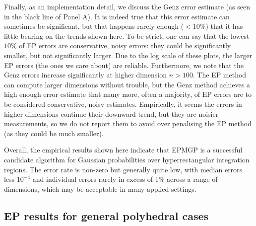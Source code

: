 \documentclass[twoside,11pt]{article}
\begin{document}
Finally, as an implementation detail, we discuss the Genz error estimate (as seen in the black line of Panel A).  It is indeed true that this error estimate can sometimes be significant, but that happens rarely enough ($<10\%$) that it has little bearing on the trends shown here.  To be strict, one can say that the lowest $10\%$ of EP errors are conservative, noisy errors: they could be significantly smaller, but not significantly larger.  Due to the log scale of these plots, the larger EP errors (the ones we care about) are reliable.  Furthermore, we note that the Genz errors increase significantly at higher dimension $n>100$.  The EP method can compute larger dimensions without trouble, but the Genz method achieves a high enough error estimate that many more, often a majority, of EP errors are to be considered conservative, noisy estimates.  Empirically, it seems the errors in higher dimensions continue their downward trend, but they are noisier measurements, so we do not report them to avoid over penalising the EP method (as they could be much smaller).

Overall, the empirical results shown here indicate that EPMGP is a successful candidate algorithm for Gaussian probabilities over hyperrectangular integration regions.  The error rate is non-zero but generally quite low, with median errors less $10^{-4}$ and individual errors rarely in excess of 1\% across a range of dimensions, which may be acceptable in many applied settings.   


\subsection{EP results for general polyhedral cases}
\label{sec:generalresults}
\end{document}
